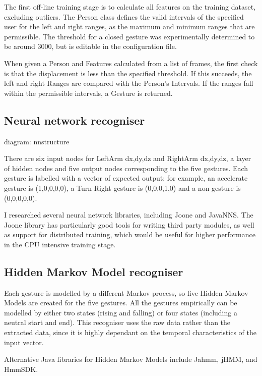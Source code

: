 \documentclass[12pt,a4,notitlepage]{report}
\renewcommand{\_}{\texttt{\symbol{95}}}
\newcommand{\<}{\texttt{\symbol{60}}}
\renewcommand{\>}{\texttt{\symbol{62}}}
\begin{document}
The first off-line training stage is to calculate all features on the training dataset, excluding outliers. The Person class defines the valid intervals of the specified user for the left and right ranges, as the maximum and minimum ranges that are permissible. The threshold for a closed gesture was experimentally determined to be around 3000, but is editable in the configuration file.

When given a Person and Features calculated from a list of frames, the first check is that the displacement is less than the specified threshold. If this succeeds, the left and right Ranges are compared with the Person's Intervals. If the ranges fall within the permissible intervals, a Gesture is returned.

\subsection{Neural network recogniser}

{diagram: nnstructure}

There are six input nodes for LeftArm {dx,dy,dz} and RightArm {dx,dy,dz}, a layer of hidden nodes and five output nodes corresponding to the five gestures. Each gesture is labelled with a vector of expected output; for example, an accelerate gesture is (1,0,0,0,0), a Turn Right gesture is (0,0,0,1,0) and a non-gesture is (0,0,0,0,0).

I researched several neural network libraries, including Joone and JavaNNS. The Joone library has particularly good tools for writing third party modules, as well as support for distributed training, which would be useful for higher performance in the CPU intensive training stage.

\subsection{Hidden Markov Model recogniser}

Each gesture is modelled by a different Markov process, so five Hidden Markov Models are created for the five gestures. All the gestures empirically can be modelled by either two states (rising and falling) or four states (including a neutral start and end). This recogniser uses the raw data rather than the extracted data, since it is highly dependant on the temporal characteristics of the input vector.

Alternative Java libraries for Hidden Markov Models include Jahmm, jHMM, and HmmSDK.
\end{document}
